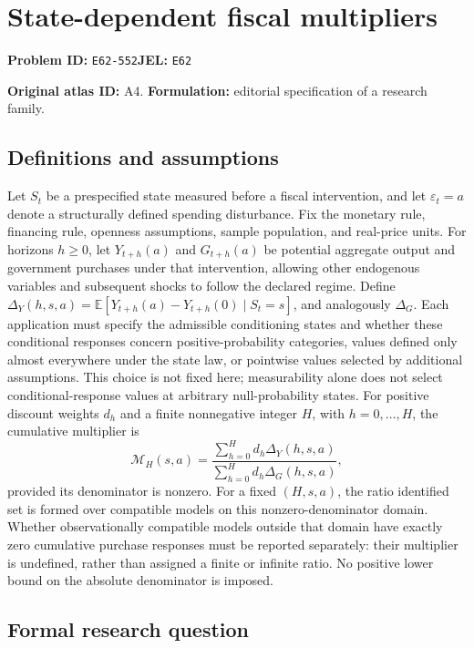 \documentclass[11pt,a4paper]{article}
\begin{document}
\section*{State-dependent fiscal multipliers}
\textbf{Problem ID:} \texttt{E62-552}\quad \textbf{JEL:} \texttt{E62}\par
\label{problem:OP-0014}
\label{atlas:prob:A4}

\noindent\textbf{Original atlas ID:} A4. \textbf{Formulation:} editorial specification of a research family.

\subsection*{Definitions and assumptions}

Let $S_t$ be a prespecified state measured before a fiscal intervention, and let $\varepsilon_t=a$ denote a structurally defined spending disturbance. Fix the monetary rule, financing rule, openness assumptions, sample population, and real-price units. For horizons $h\ge0$, let $Y_{t+h}(a)$ and $G_{t+h}(a)$ be potential aggregate output and government purchases under that intervention, allowing other endogenous variables and subsequent shocks to follow the declared regime. Define $\Delta_Y(h,s,a)=\mathbb E[Y_{t+h}(a)-Y_{t+h}(0)\mid S_t=s]$, and analogously $\Delta_G$. Each application must specify the admissible conditioning states and whether these conditional responses concern positive-probability categories, values defined only almost everywhere under the state law, or pointwise values selected by additional assumptions. This choice is not fixed here; measurability alone does not select conditional-response values at arbitrary null-probability states. For positive discount weights $d_h$ and a finite nonnegative integer $H$, with $h=0,\ldots,H$, the cumulative multiplier is
\[
\mathcal M_H(s,a)=\frac{\sum_{h=0}^Hd_h\Delta_Y(h,s,a)}
 {\sum_{h=0}^Hd_h\Delta_G(h,s,a)},
\]
provided its denominator is nonzero. For a fixed $(H,s,a)$, the ratio identified set is formed over compatible models on this nonzero-denominator domain. Whether observationally compatible models outside that domain have exactly zero cumulative purchase responses must be reported separately: their multiplier is undefined, rather than assigned a finite or infinite ratio. No positive lower bound on the absolute denominator is imposed.

\subsection*{Formal research question}
\end{document}
